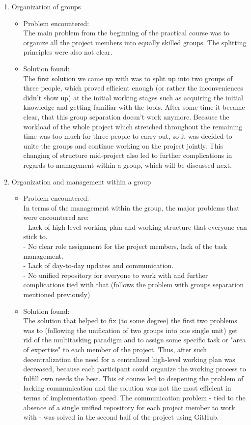 \begin{enumerate}
  \item Organization of groups
  \begin{itemize}
      \item Problem encountered:\\
      The main problem from the beginning of the practical course was to organize all the project members into equally skilled groups. The splitting principles were also not clear.
      \item Solution found:\\
      The first solution we came up with was to split up into two groups of three people, which proved efficient enough (or rather the inconveniences didn't show up) at the initial working stages such as acquiring the initial knowledge and getting familiar with the tools. After some time it became clear, that this group separation doesn't work anymore. Because the workload of the whole project which stretched throughout the remaining time was too much for three people to carry out, so it was decided to unite the groups and continue working on the project jointly. This changing of structure mid-project also led to further complications in regards to management within a group, which will be discussed next.
  \end{itemize}
  \item Organization and management within a group
   \begin{itemize}
      \item Problem encountered:\\
        In terms of the management within the group, the major problems that were encountered are: \\
        - Lack of high-level working plan and working structure that everyone can stick to.\\
        - No clear role assignment for the project members, lack of the task management.\\
        - Lack of day-to-day updates and communication.\\
        - No unified repository for everyone to work with and further complications tied with that (follows the problem with groups separation mentioned previously)
      \item Solution found:\\
        The solution that helped to fix (to some degree) the first two problems was to (following the unification of two groups into one single unit) get rid of the multitasking paradigm  and to assign some specific task or "area of expertise" to each member of the project. Thus, after such decentralization the need for a centralized high-level working plan was decreased, because each participant could organize the working process to fulfill own needs the best. This of course led to deepening the problem of lacking communication and the solution was not the most efficient in terms of implementation speed. 
        The communication problem - tied to the absence of a single unified repository for each project member to work with - was solved in the second half of the project using GitHub.

  \end{itemize}
\end{enumerate}

